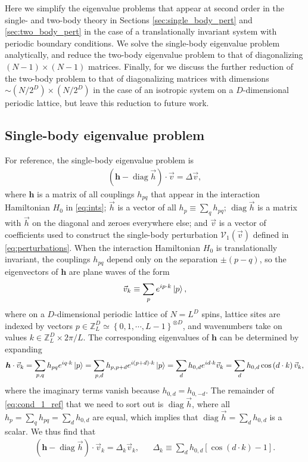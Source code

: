 \documentclass[nofootinbib,notitlepage,11pt]{revtex4-2}
\newcommand{\p}[1]{\left(#1\right)} %
\renewcommand{\sp}[1]{\left[#1\right]} %
\renewcommand{\set}[1]{\left\{#1\right\}} %
\renewcommand{\c}{\cdot} %
\newcommand{\m}{\bm} %
\renewcommand{\v}{\vec} %
\newcommand{\1}{\mathds{1}}
\newcommand{\V}{\mathcal{V}}
\newcommand{\ZZ}{\mathbb{Z}}
\DeclareMathOperator{\diag}{diag}
\begin{document}
Here we simplify the eigenvalue problems that appear at second order
in the single- and two-body theory in Sections
\ref{sec:single_body_pert} and \ref{sec:two_body_pert} in the case of
a translationally invariant system with periodic boundary conditions.
We solve the single-body eigenvalue problem analytically, and reduce
the two-body eigenvalue problem to that of diagonalizing
$\p{N-1}\times\p{N-1}$ matrices.  Finally, for we discuss the further
reduction of the two-body problem to that of diagonalizing matrices
with dimensions $\sim\p{N/2^D}\times\p{N/2^D}$ in the case of an
isotropic system on a $D$-dimensional periodic lattice, but leave this
reduction to future work.

\subsection{Single-body eigenvalue problem}
\label{sec:trans_inv_single}

For reference, the single-body eigenvalue problem is
\begin{align}
  \p{\m h - \diag\v h}\c\v v = \Delta \v v,
  \label{eq:cond_1_ref}
\end{align}
where $\m h$ is a matrix of all couplings $h_{pq}$ that appear in the
interaction Hamiltonian $H_0$ in \eqref{eq:ints}; $\v h$ is a vector
of all $h_p\equiv\sum_q h_{pq}$; $\diag\v h$ is a matrix with $\v h$
on the diagonal and zeroes everywhere else; and $\v v$ is a vector of
coefficients used to construct the single-body perturbation
$\V_1\p{\v v}$ defined in \eqref{eq:perturbations}.  When the
interaction Hamiltonian $H_0$ is translationally invariant, the
couplings $h_{pq}$ depend only on the separation $\pm\p{p-q}$, so the
eigenvectors of $\m h$ are plane waves of the form
\begin{align}
  \v v_k \equiv \sum_p e^{ip\c k} \ket{p},
\end{align}
where on a $D$-dimensional periodic lattice of $N=L^D$ spins, lattice
sites are indexed by vectors
$p\in\ZZ_L^D\simeq\set{0,1,\cdots,L-1}^{\otimes D}$, and wavenumbers
take on values $k\in\ZZ_L^D\times2\pi/L$.  The corresponding
eigenvalues of $\m h$ can be determined by expanding
\begin{align}
  \m h\c\v v_k = \sum_{p,q} h_{pq} e^{iq\c k} \ket{p}
  = \sum_{p,d} h_{p,p+d} e^{i\p{p+d}\c k} \ket{p}
  = \sum_d h_{0,d} e^{id\c k} \v v_k
  = \sum_d h_{0,d} \cos\p{d\c k} \v v_k,
\end{align}
where the imaginary terms vanish because $h_{0,d}=h_{0,-d}$.  The
remainder of \eqref{eq:cond_1_ref} that we need to sort out is
$\diag\v h$, where all $h_p=\sum_qh_{pq}=\sum_dh_{0,d}$ are equal,
which implies that $\diag\v h=\sum_dh_{0,d}$ is a scalar.  We thus
find that
\begin{align}
  \p{\m h - \diag\v h}\c\v v_k = \Delta_k \v v_k,
  &&
  \Delta_k \equiv \sum_d h_{0,d} \sp{\cos\p{d\c k}-1}.
\end{align}
\end{document}
